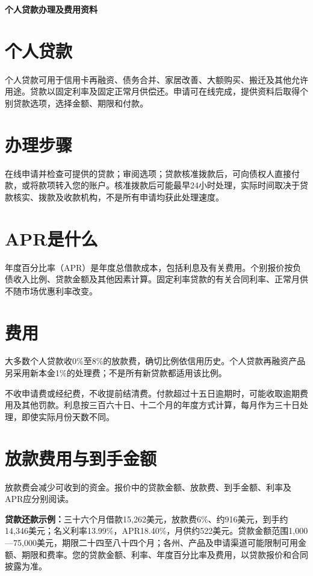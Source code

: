 \documentclass[UTF8,fontset=none,11pt,a4paper]{ctexart}
\begin{document}
{\noindent\fontsize{20}{25}\selectfont\bfseries 个人贷款办理及费用资料\par}
\vspace{10pt}
\section*{个人贷款}
个人贷款可用于信用卡再融资、债务合并、家居改善、大额购买、搬迁及其他允许用途。贷款以固定利率及固定正常月供偿还。申请可在线完成，提供资料后取得个别贷款选项，选择金额、期\allowbreak\mbox{限和付款。}


\section*{办理步骤}
在线申请并检查可提供的贷款；审阅选项；贷款核准拨款后，可向债权人直接付款，或将款项转入您的账户。核准拨款后可能最早24小时处理，实际时间取决于贷款核实、拨款及收款机构，不是所有申请均获此\allowbreak\mbox{处理速度。}


\section*{APR是什么}
年度百分比率（APR）是年度总借款成本，包括利息及有关费用。个别报价按负债收入比例、贷款金额及其他因素计算。固定利率贷款的有关合同利率、正常月供不随市场优惠利\allowbreak\mbox{率改变。}


\section*{费用}
大多数个人贷款收0\%至8\%的放款费，确切比例依信用历史。个人贷款再融资产品另采用新本金1\%的处理费；不是所有新贷款都适\allowbreak\mbox{用该比例。}


不收申请费或经纪费，不收提前结清费。付款超过十五日逾期时，可能收取逾期费用及其他罚款。利息按三百六十日、十二个月的年度方式计算，每月作为三十日处理，即使实际月份\allowbreak\mbox{天数不同。}


\section*{放款费用与到手金额}
放款费会减少可收到的资金。报价中的贷款金额、放款费、到手金额、利率及APR应\allowbreak\mbox{分别阅读。}


\textbf{贷款还款示例：}三十六个月借款15,262美元，放款费6\%、约916美元，到手约14,346美元；名义利率13.99\%，APR18.40\%，月供约522美元。贷款金额范围1,000—75,000美元，期限二十四至八十四个月；各州、产品及申请渠道可能限制可用金额、期限和费率。您的贷款金额、利率、年度百分比率及费用，以贷款报价和合同\allowbreak\mbox{披露为准。}
\end{document}
